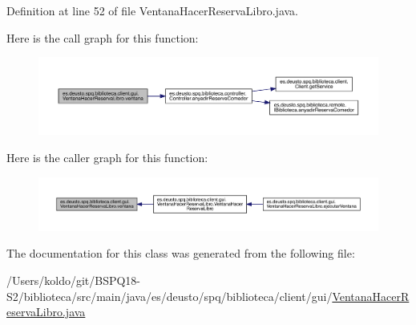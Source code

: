 Definition at line 52 of file Ventana\+Hacer\+Reserva\+Libro.\+java.

Here is the call graph for this function\+:
\nopagebreak
\begin{figure}[H]
\begin{center}
\leavevmode
\includegraphics[width=350pt]{classes_1_1deusto_1_1spq_1_1biblioteca_1_1client_1_1gui_1_1_ventana_hacer_reserva_libro_a62aec2a93b911472883ffb3bb83f3d92_cgraph}
\end{center}
\end{figure}
Here is the caller graph for this function\+:
\nopagebreak
\begin{figure}[H]
\begin{center}
\leavevmode
\includegraphics[width=350pt]{classes_1_1deusto_1_1spq_1_1biblioteca_1_1client_1_1gui_1_1_ventana_hacer_reserva_libro_a62aec2a93b911472883ffb3bb83f3d92_icgraph}
\end{center}
\end{figure}


The documentation for this class was generated from the following file\+:\begin{DoxyCompactItemize}
\item 
/\+Users/koldo/git/\+B\+S\+P\+Q18-\/\+S2/biblioteca/src/main/java/es/deusto/spq/biblioteca/client/gui/\mbox{\hyperlink{_ventana_hacer_reserva_libro_8java}{Ventana\+Hacer\+Reserva\+Libro.\+java}}\end{DoxyCompactItemize}
